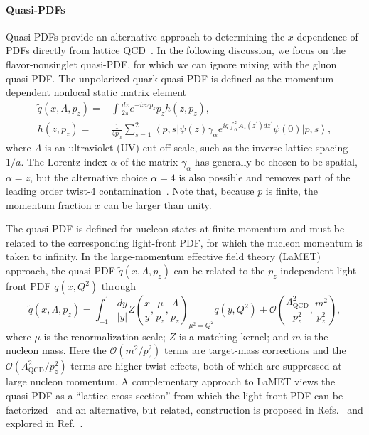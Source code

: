 \paragraph{Quasi-PDFs}
Quasi-PDFs provide an alternative approach to determining the $x$-dependence of PDFs directly from lattice QCD~\cite{Ji:2013dva,Ji:2014gla}. In the following discussion, we focus on the flavor-nonsinglet quasi-PDF, for which we can ignore mixing with the gluon quasi-PDF. The unpolarized quark quasi-PDF is defined as the momentum-dependent
nonlocal static matrix element
\begin{align}\label{eq:qPDF}
\widetilde{q}(x,\Lambda,p_z)  =& \int \frac{dz}{2\pi} e^{-i x z p_z} p_z h(z,p_z), \nonumber \\
h(z,p_z) =&
\frac{1}{4 p_{\alpha}}\sum_{s=1}^2\left\langle p,s\right\vert \bar{\psi}(z)\gamma_\alpha e^{ig\int_0^z
A_z(z^\prime) dz^\prime} \psi(0) \left\vert p,s\right\rangle ,
\end{align}
where $\Lambda$ is an ultraviolet (UV) cut-off scale, such as the inverse lattice spacing $1/a$. The Lorentz index $\alpha$ of the matrix $\gamma_\alpha$ has generally be chosen to be spatial, $\alpha = z$, but the alternative choice $\alpha = 4$ is also possible and removes part of the leading order twist-4 contamination~\cite{Radyushkin:2016hsy}. 
Note that, because $p$ is finite, the momentum fraction $x$ can be larger than unity.

The quasi-PDF is defined for nucleon states at finite momentum and must be related to the corresponding light-front PDF, for which the nucleon momentum is taken to infinity.
In the  large-momentum  effective field theory (LaMET) approach, the quasi-PDF $\widetilde{q}(x,\Lambda,p_z)$ can be related to the $p_z$-independent
light-front PDF $q(x,Q^2)$ through~\cite{Ji:2013dva,Ji:2014gla}
\begin{equation} \label{eq:qPDFmatching}
\widetilde{q}(x,\Lambda ,p_z) = 
  \int_{-1}^1 \frac{dy}{\left\vert y\right\vert} 
    Z\left( \frac{x}{y}, \frac{\mu}{p_z}, \frac{\Lambda}{p_z}\right)_{\mu^2 = Q^2} q(y,Q^2) +
  \mathcal{O}\left( \frac{\Lambda_\text{QCD}^2}{p_z^2},\frac{m^2}{p_z^2}\right), 
\end{equation}
where $\mu$ is the renormalization scale;
$Z$ is a matching kernel; and $m$ is the nucleon mass.
Here the $\mathcal{O}\left(m^2/p_z^2\right)$ terms are target-mass corrections and the $ \mathcal{O}\left(\Lambda_\text{QCD}^2/p_z^2\right)$ terms are higher twist effects, both of which are suppressed at large nucleon momentum. A complementary approach to LaMET views the quasi-PDF as a ``lattice cross-section'' from which the light-front PDF can be factorized~\cite{Ma:2014jla, Ma:2014jga,Ma:2017pxb} and an alternative, but related, construction is proposed in Refs.~\cite{Radyushkin:2016hsy,Radyushkin:2017cyf} and explored in Ref.~\cite{Orginos:2017kos}.

